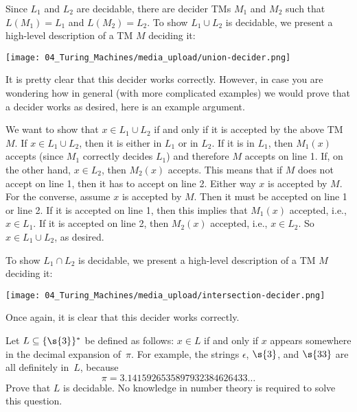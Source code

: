 \begin{solution}
\label{sol:Turing-Machines::decidable}
Since $L_1$ and $L_2$ are decidable, there are decider TMs $M_1$ and $M_2$ such that $L(M_1) = L_1$ and $L(M_2) = L_2$. To show $L_1 \cup L_2$ is decidable, we present a high-level description of a TM $M$ deciding it:
\begin{center}
    \texttt{[image: 04\_Turing\_Machines/media\_upload/union-decider.png]}
\end{center}
It is pretty clear that this decider works correctly. However, in case you are wondering how in general (with more complicated examples) we would prove that a decider works as desired, here is an example argument.

We want to show that $x \in L_1 \cup L_2$ if and only if it is accepted by the above TM $M$. If $x \in L_1 \cup L_2$, then it is either in $L_1$ or in $L_2$. If it is in $L_1$, then $M_1(x)$ accepts (since $M_1$ correctly decides $L_1$) and therefore $M$ accepts on line 1. If, on the other hand, $x \in L_2$, then $M_2(x)$ accepts. This means that if $M$ does not accept on line 1, then it has to accept on line 2. Either way $x$ is accepted by $M$. For the converse, assume $x$ is accepted by $M$. Then it must be accepted on line 1 or line 2. If it is accepted on line 1, then this implies that $M_1(x)$ accepted, i.e., $x \in L_1$. If it is accepted on line 2, then $M_2(x)$ accepted, i.e., $x \in L_2$. So $x \in L_1 \cup L_2$, as desired.

To show $L_1 \cap L_2$ is decidable, we present a high-level description of a TM $M$ deciding it:
\begin{center}
    \texttt{[image: 04\_Turing\_Machines/media\_upload/intersection-decider.png]}
\end{center}
Once again, it is clear that this decider works correctly.

\end{solution}

\begin{exercise}
\label{exercise:Decidable-language-based-on-pi}
                                    Let $L \subseteq \{\s{3}\}^*$ be defined as follows:  $x \in L$ if and only if $x$ appears somewhere in the decimal expansion of~$\pi$.  For example, the strings $\epsilon$, $\s{3}$, and $\s{33}$ are all definitely in~$L$, because
    \[
         \pi = 3.1415926535897932384626433\dots
    \]
    Prove that $L$ is decidable. No knowledge in number theory is required to solve this question.

\end{exercise}

